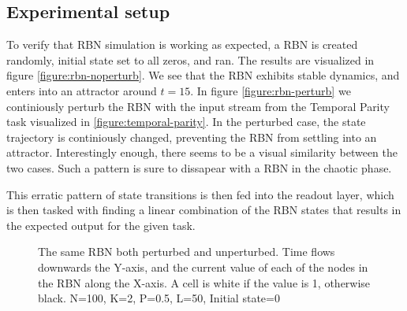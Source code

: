 \subsection{Experimental setup}

To verify that RBN simulation is working as expected,
a RBN is created randomly, initial state set to all zeros, and ran.
The results are visualized in figure \ref{figure:rbn-noperturb}.
We see that the RBN exhibits stable dynamics, and enters into an attractor around $t=15$.
In figure \ref{figure:rbn-perturb} we continiously perturb the RBN with the input stream from the Temporal Parity task visualized in \ref{figure:temporal-parity}.
In the perturbed case, the state trajectory is continiously changed, preventing the RBN from settling into an attractor.
Interestingly enough, there seems to be a visual similarity between the two cases.
Such a pattern is sure to dissapear with a RBN in the chaotic phase.

This erratic pattern of state transitions is then fed into the readout layer,
which is then tasked with finding a linear combination of the RBN states that results in the expected output for the given task.

\begin{figure}
  \caption{
    The same RBN both perturbed and unperturbed.
    Time flows downwards the Y-axis,
    and the current value of each of the nodes in the RBN along the X-axis.
    A cell is white if the value is 1, otherwise black.
    N=100, K=2, P=0.5, L=50, Initial state=0
  }
\end{figure}
